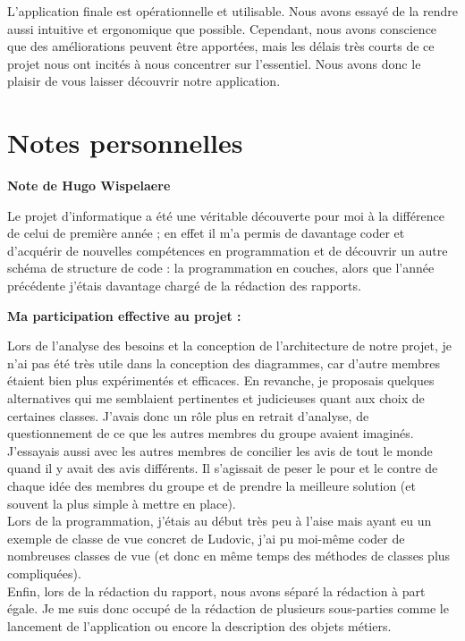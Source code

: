 \documentclass[11pt]{article}
\begin{document}
\bigbreak

L'application finale est opérationnelle et utilisable. Nous avons essayé de la rendre aussi intuitive et ergonomique que possible. Cependant, nous avons conscience que des améliorations peuvent être apportées, mais les délais très courts de ce projet nous ont incités à nous concentrer sur l'essentiel. Nous avons donc le plaisir de vous laisser découvrir notre application.





\newpage

\section{Notes personnelles}

\textbf{\Large Note de Hugo Wispelaere}

Le projet d’informatique a été une véritable découverte pour moi à la différence de celui de première année ; en effet il m’a permis de davantage coder et d’acquérir de nouvelles compétences en programmation et de découvrir un autre schéma de structure de code : la programmation en couches, alors que l’année précédente j’étais davantage chargé de la rédaction des rapports.

\bigbreak
\textbf{ Ma participation effective au projet : }

Lors de l’analyse des besoins et la conception de l’architecture de notre projet, je n’ai pas été très utile dans la conception des diagrammes, car d'autre membres étaient bien plus expérimentés et efficaces. En revanche, je proposais quelques alternatives qui me semblaient pertinentes et judicieuses quant aux choix de certaines classes.  J’avais donc un rôle plus en retrait d’analyse, de questionnement de ce que les autres membres du groupe avaient imaginés. J'essayais aussi avec les autres membres de concilier les avis de tout le monde quand il y avait des avis différents. Il s’agissait de peser le pour et le contre de chaque idée des membres du groupe et de prendre la meilleure solution (et souvent la plus simple à mettre en place). \\ 

Lors de la programmation, j’étais au début très peu à l’aise mais ayant eu un exemple de classe de vue concret de Ludovic, j’ai pu moi-même coder de nombreuses classes de vue (et donc en même temps des méthodes de classes plus compliquées). \\ 

Enfin, lors de la rédaction du rapport, nous avons séparé la rédaction à part égale. Je me suis donc occupé de la rédaction de plusieurs sous-parties comme le lancement de l’application ou encore la description des objets métiers.
\end{document}

